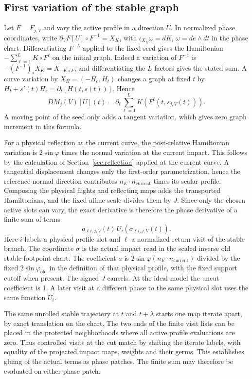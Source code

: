 \documentclass[11pt]{article}
\begin{document}
\subsection{First variation of the stable
graph}\label{first-variation-of-the-stable-graph}

Let \(F=F_{j,V}\) and vary the active profile in a direction \(U\). In
normalized phase coordinates, write \(\partial_V F[U]\circ F^{-1}=X_K\), with
\(\iota_{X_K}\omega=dK\), \(\omega=de\wedge dt\) in the phase chart.
Differentiating \(F^{-L}\) applied to the fixed seed gives the Hamiltonian
\(-\sum_{\ell=1}^L K\circ F^\ell\) on the initial graph. Indeed a variation of
\(F^{-1}\) is \(- (F^{-1})_*X_K=X_{-K\circ F}\), and differentiating the \(L\)
factors gives the stated sum. A curve variation by \(X_H=(-H_e,H_t)\) changes a
graph at fixed \(t\) by \(H_t+s'(t)H_e=\partial_t[H(t,s(t))]\). Hence \[
 D M_j(V)[U](t)=\partial_t\sum_{\ell=1}^L K(F^\ell(t,s_{j,V}(t))).
\] A moving point of the seed only adds a tangent variation, which gives zero
graph increment in this formula.

For a physical reflection at the current curve, the post-relative Hamiltonian
variation is \(2\sin\varphi\) times the normal variation at the current impact.
This follows by the calculation of Section~\ref{sec:reflection}
applied at the current curve. A tangential displacement changes only the
first-order parametrization, hence the reference-normal direction contributes
\(n_E\cdot n_{\mathrm{current}}\) times its scalar profile. Composing the
physical flights and reflecting maps adds the transported Hamiltonians, and the
fixed affine scale divides them by \(J\). Since only the chosen active slots can
vary, the exact derivative is therefore the phase derivative of a finite sum of
terms \[
 a_{\ell i,j,V}(t)\,U_i(\sigma_{\ell i,j,V}(t)).
\] Here \(i\) labels a physical profile slot and \(\ell\) a normalized return
visit of the stable branch. The coordinate \(\sigma\) is the actual impact read
in the scaled inverse old stable-footpoint chart. The coefficient \(a\) is
\(2\sin\varphi(n_E\cdot n_{\mathrm{current}})\) divided by the fixed
\(2\sin\varphi_{\mathrm{old}}\) in the definition of that physical profile, with
the fixed support cutoff when present. The signed \(J\) cancels. At the ideal
model the uncut coefficient is 1. A later visit at a different phase to the same
physical slot uses the same function \(U_i\).

The same unrolled stable trajectory at \(t\) and \(t+\lambda\) starts one map iterate
apart, by exact translation on the chart. The two ends of the finite visit lists
can be placed in the protected neighborhoods where all active profile
evaluations are zero. Thus controlled visits at the cut match by shifting the
iterate labels, with equality of the projected impact maps, weights and their
germs. This establishes gluing of the actual terms as phase patches. The finite
sum may therefore be evaluated on either phase patch.
\end{document}
